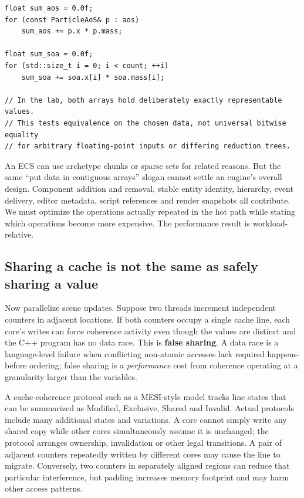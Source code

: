 \begin{verbatim}
float sum_aos = 0.0f;
for (const ParticleAoS& p : aos)
    sum_aos += p.x * p.mass;

float sum_soa = 0.0f;
for (std::size_t i = 0; i < count; ++i)
    sum_soa += soa.x[i] * soa.mass[i];

// In the lab, both arrays hold deliberately exactly representable values.
// This tests equivalence on the chosen data, not universal bitwise equality
// for arbitrary floating-point inputs or differing reduction trees.
\end{verbatim}

An ECS can use archetype chunks or sparse sets for related reasons. But the same ``put data in contiguous arrays'' slogan cannot settle an engine's overall design. Component addition and removal, stable entity identity, hierarchy, event delivery, editor metadata, script references and render snapshots all contribute. We must optimize the operations actually repeated in the hot path while stating which operations become more expensive. The performance result is workload-relative.

\subsection{Sharing a cache is not the same as safely sharing a value}\label{01-foundations-i-ch007-sharing-a-cache-is-not-the-same-as-safely-sharing-a-value}

Now parallelize scene updates. Suppose two threads increment independent counters in adjacent locations. If both counters occupy a single cache line, each core's writes can force coherence activity even though the values are distinct and the C++ program has no data race. This is \textbf{false sharing}. A data race is a language-level failure when conflicting non-atomic accesses lack required happens-before ordering; false sharing is a \emph{performance} cost from coherence operating at a granularity larger than the variables.

A cache-coherence protocol such as a MESI-style model tracks line states that can be summarized as Modified, Exclusive, Shared and Invalid. Actual protocols include many additional states and variations. A core cannot simply write any shared copy while other cores simultaneously assume it is unchanged; the protocol arranges ownership, invalidation or other legal transitions. A pair of adjacent counters repeatedly written by different cores may cause the line to migrate. Conversely, two counters in separately aligned regions can reduce that particular interference, but padding increases memory footprint and may harm other access patterns.

